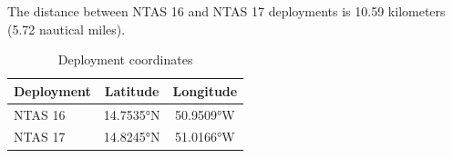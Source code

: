 
The distance between NTAS 16 and NTAS 17 deployments is 10.59 kilometers (5.72 nautical miles).

\begin{table}[ht]
\centering
\caption{Deployment coordinates}
\begin{tabular}{lcc}
\hline
\textbf{Deployment} & \textbf{Latitude} & \textbf{Longitude} \\
\hline
NTAS 16 & 14.7535°N & 50.9509°W \\
NTAS 17 & 14.8245°N & 51.0166°W \\
\hline
\end{tabular}
\end{table}
